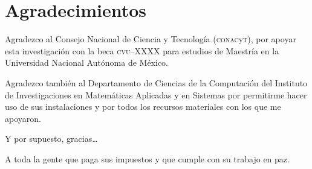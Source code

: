 \chapter*{Agradecimientos}

{\small
Agradezco al Consejo Nacional de Ciencia y Tecnología (\textsc{conac}y\textsc{t}), por apoyar esta investigación con la beca \textsc{cvu}--XXXX para estudios de Maestría en la Universidad Nacional Autónoma de México.

Agradezco también al Departamento de Ciencias de la Computación del Instituto de Investigaciones en Matemáticas Aplicadas y en Sistemas por permitirme hacer uso de sus instalaciones y por todos los recursos materiales con los que me apoyaron.

Y por supuesto, gracias\ldots

A toda la gente que paga sus impuestos y que cumple con su trabajo en paz.
}
